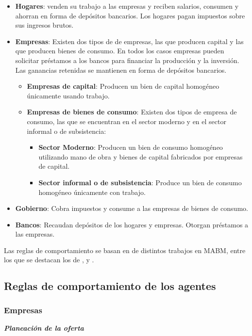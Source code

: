 \documentclass[12pt,a4paper]{article}
\begin{document}
\begin{itemize}
\item \textbf{Hogares}: venden su trabajo a las empresas y reciben salarios, consumen y ahorran en forma de depósitos bancarios. Los hogares pagan impuestos sobre sus ingresos brutos.
\item \textbf{Empresas}: Existen dos tipos de de empresas, las que producen capital y las que producen bienes de consumo. En todos los casos empresas pueden solicitar préstamos a los bancos para financiar la producción y la inversión. Las ganancias retenidas se mantienen en forma de depósitos bancarios.
\begin{itemize}
\item \textbf{Empresas de capital}: Producen un bien de capital homogéneo únicamente usando trabajo. 
\item \textbf{Empresas de bienes de consumo}: Existen dos tipos de empresa de consumo, las que se encuentran en el sector moderno y en el sector informal o de subsistencia:
\begin{itemize}
\item  \textbf{Sector Moderno}: Producen un bien de consumo homogéneo utilizando mano de obra y bienes de capital fabricados por empresas de capital.
\item  \textbf{Sector informal o de subsistencia}: Produce un bien de consumo homogéneo únicamente con trabajo.
\end{itemize}
\end{itemize}

\item \textbf{Gobierno}: Cobra impuestos y consume a las empresas de bienes de consumo.
\item \textbf{Bancos}: Recaudan depósitos de los hogares y empresas. Otorgan préstamos a las empresas. 
 
\end{itemize}

Las reglas de comportamiento se basan en de distintos trabajos en MABM, entre los que se destacan los de \cite{caiani2016agent},\cite{assenza2015emergent} y \cite{DAWID201863}.


\subsection{Reglas de comportamiento de los agentes}

\subsubsection{Empresas}
\textbf{\textit{Planeación de la oferta}}
\vspace{.2cm}
\end{document}
